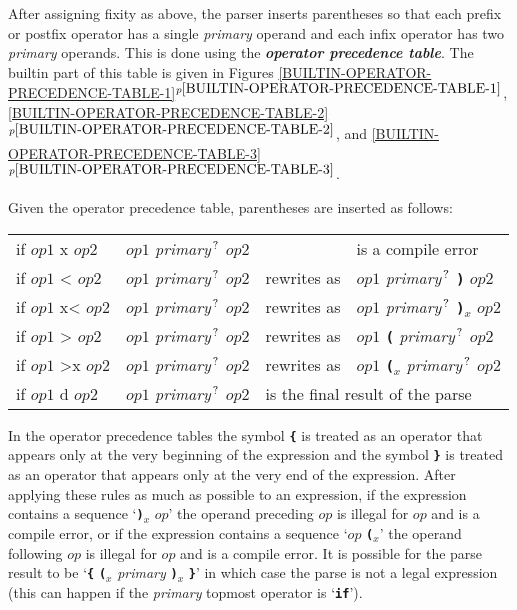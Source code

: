 \documentclass[12pt]{article}
\newcommand{\TT}[1]{{\tt \bfseries #1}}
\newcommand{\key}[1]{{\bf \em #1}\index{#1}}
\newcommand{\itemref}[1]{\ref{#1}$^{p\pageref{#1}}$}
\newcommand{\QMARK}{{$^{\,\mbox{\footnotesize ?}}$}}
\begin{document}
After assigning fixity as above, the parser inserts parentheses so that
each prefix or postfix operator has a single {\em primary} operand
and each infix operator has two {\em primary} operands.  This is
done using the \key{operator precedence table}.  The builtin part of
this table is given in Figures
\itemref{BUILTIN-OPERATOR-PRECEDENCE-TABLE-1},
\itemref{BUILTIN-OPERATOR-PRECEDENCE-TABLE-2}, and
\itemref{BUILTIN-OPERATOR-PRECEDENCE-TABLE-3}.

Given the operator precedence table, parentheses are inserted as
follows:

\begin{center}
\begin{tabular}{llcl}
if $op1$ x $op2$ & $op1$ {\em primary}\QMARK{} $op2$
		 & & is a compile error \\
if $op1$ < $op2$ & $op1$ {\em primary}\QMARK{} $op2$
		 & rewrites as
                 & $op1$ {\em primary}\QMARK{} \TT{)} $op2$ \\
if $op1$ x< $op2$ & $op1$ {\em primary}\QMARK{} $op2$
		  & rewrites as
                  & $op1$ {\em primary}\QMARK{} \TT{)$_x$} $op2$ \\
if $op1$ > $op2$ & $op1$ {\em primary}\QMARK{} $op2$
		 & rewrites as
                 & $op1$ \TT{(} {\em primary}\QMARK{} $op2$ \\
if $op1$ >x $op2$ & $op1$ {\em primary}\QMARK{} $op2$
		 & rewrites as
                 & $op1$ \TT{(}$_x$ {\em primary}\QMARK{} $op2$ \\
if $op1$ d $op2$ & $op1$ {\em primary}\QMARK{} $op2$
                 & \multicolumn{2}{l}{is the final result of the parse} \\
\end{tabular}
\end{center}

In the operator precedence tables the symbol \TT{\{} is treated as an
operator that appears only at the very beginning of the expression
and the symbol \TT{\}} is treated as an operator that appears only at
the very end of the expression.  After applying these rules as much
as possible to an expression,
if the expression contains a sequence `\TT{)}$_x$ $op$' the operand
preceding $op$ is illegal for $op$ and is a compile error, or
if the expression contains a sequence `$op$ \TT{(}$_x$' the operand
following $op$ is illegal for $op$ and is a compile error.
It is possible for the parse result to be
`\TT{\{} \TT{(}$_x$ {\em primary} \TT{)}$_x$ \TT{\}}' in which case
the parse is not a legal expression (this can happen if the {\em primary}
topmost operator is `\TT{if}').
\end{document}
